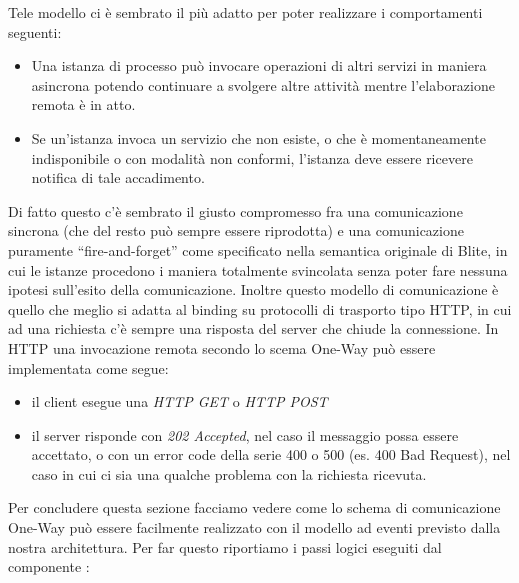 Tele modello ci \`e sembrato il più adatto per poter realizzare i 
comportamenti seguenti:

\begin{itemize}
  \item Una istanza di processo può invocare operazioni di altri servizi in
  maniera asincrona potendo continuare a svolgere altre attività mentre
  l'elaborazione remota \`e in atto.
  
  \item Se un'istanza invoca un servizio che non esiste, o che \`e
  momentaneamente indisponibile o con modalità non conformi, l'istanza deve
  essere ricevere notifica di tale accadimento.
\end{itemize}

Di fatto questo c'\`e sembrato il giusto compromesso fra una comunicazione
sincrona (che del resto può sempre essere riprodotta) e una comunicazione puramente
``fire-and-forget'' come specificato nella semantica originale di Blite, in cui le
istanze procedono i maniera totalmente svincolata senza poter fare nessuna ipotesi sull'esito della comunicazione. Inoltre questo
modello di comunicazione \`e quello che meglio si adatta al binding su
protocolli di trasporto tipo HTTP, in cui ad una richiesta c'è sempre una
risposta del server che chiude la connessione. In HTTP una invocazione remota 
secondo lo scema One-Way può essere implementata come segue:

\begin{itemize}
  \item il client esegue una \emph{HTTP GET} o \emph{HTTP POST}
  \item il server risponde con \emph{202 Accepted}, nel caso il messaggio possa
  essere accettato, o con un error code della serie 400 o 500 (es. 400 Bad
  Request), nel caso in cui ci sia una qualche problema con la richiesta
  ricevuta.
\end{itemize}


Per concludere questa sezione facciamo vedere come lo schema di comunicazione
One-Way può essere facilmente realizzato con il modello ad eventi previsto
dalla nostra architettura. Per far questo riportiamo i passi logici eseguiti
dal componente :

